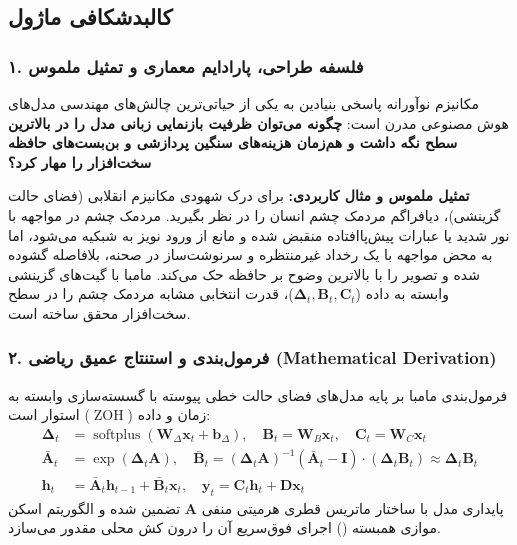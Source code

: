 \subsection{کالبدشکافی ماژول }

\subsubsection*{۱. فلسفه طراحی، پارادایم معماری و تمثیل ملموس}
مکانیزم نوآورانه  پاسخی بنیادین به یکی از حیاتی‌ترین چالش‌های مهندسی مدل‌های هوش مصنوعی مدرن است: \textbf{چگونه می‌توان ظرفیت بازنمایی زبانی مدل را در بالاترین سطح نگه داشت و هم‌زمان هزینه‌های سنگین پردازشی و بن‌بست‌های حافظه سخت‌افزار را مهار کرد؟}

\textbf{تمثیل ملموس و مثال کاربردی:}
برای درک شهودی مکانیزم انقلابی  (فضای حالت گزینشی)، دیافراگم مردمک چشم انسان را در نظر بگیرید. مردمک چشم در مواجهه با نور شدید یا عبارات پیش‌پاافتاده منقبض شده و مانع از ورود نویز به شبکیه می‌شود، اما به محض مواجهه با یک رخداد غیرمنتظره و سرنوشت‌ساز در صحنه، بلافاصله گشوده شده و تصویر را با بالاترین وضوح بر حافظه حک می‌کند. مامبا با گیت‌های گزینشی وابسته به داده ($\boldsymbol{\Delta}_t, \mathbf{B}_t, \mathbf{C}_t$)، قدرت انتخابی مشابه مردمک چشم را در سطح سخت‌افزار محقق ساخته است.

\subsubsection*{۲. فرمول‌بندی و استنتاج عمیق ریاضی (Mathematical Derivation)}
فرمول‌بندی مامبا بر پایه مدل‌های فضای حالت خطی پیوسته با گسسته‌سازی وابسته به زمان و داده ($\operatorname{ZOH}$) استوار است:
\begin{align}
\boldsymbol{\Delta}_t &= \operatorname{softplus}(\mathbf{W}_\Delta \mathbf{x}_t + \mathbf{b}_\Delta), \quad \mathbf{B}_t = \mathbf{W}_B \mathbf{x}_t, \quad \mathbf{C}_t = \mathbf{W}_C \mathbf{x}_t \\
\bar{\mathbf{A}}_t &= \exp(\boldsymbol{\Delta}_t \mathbf{A}), \quad \bar{\mathbf{B}}_t = (\boldsymbol{\Delta}_t \mathbf{A})^{-1} (\bar{\mathbf{A}}_t - \mathbf{I}) \cdot (\boldsymbol{\Delta}_t \mathbf{B}_t) \approx \boldsymbol{\Delta}_t \mathbf{B}_t \\
\mathbf{h}_t &= \bar{\mathbf{A}}_t \mathbf{h}_{t-1} + \bar{\mathbf{B}}_t \mathbf{x}_t, \quad \mathbf{y}_t = \mathbf{C}_t \mathbf{h}_t + \mathbf{D} \mathbf{x}_t
\end{align}
پایداری مدل با ساختار ماتریس قطری هرمیتی منفی $\mathbf{A}$ تضمین شده و الگوریتم اسکن موازی همبسته () اجرای فوق‌سریع آن را درون کش محلی مقدور می‌سازد.

